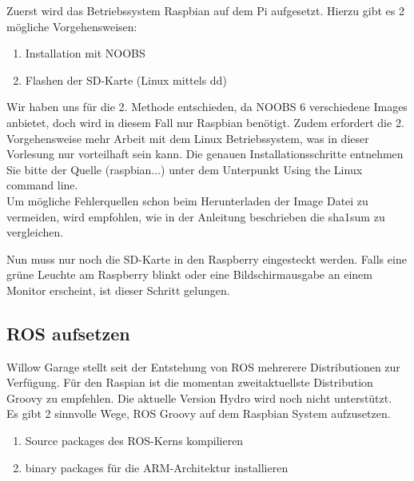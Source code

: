 \documentclass[12pt]{article}
\begin{document}
Zuerst wird das Betriebssystem Raspbian auf dem Pi aufgesetzt.
Hierzu gibt es 2 mögliche Vorgehensweisen:
\begin{enumerate}
\item Installation mit NOOBS
\item Flashen der SD-Karte (Linux mittels dd)
\end{enumerate}

Wir haben uns für die 2. Methode entschieden, da NOOBS 6 verschiedene Images anbietet, doch wird in diesem Fall nur Raspbian benötigt.
Zudem erfordert die 2. Vorgehensweise mehr Arbeit mit dem Linux Betriebssystem, was in dieser Vorlesung nur vorteilhaft sein kann.
Die genauen Installationsschritte entnehmen Sie bitte der Quelle (raspbian...) unter dem Unterpunkt Using the Linux command line. \\
Um mögliche Fehlerquellen schon beim Herunterladen der Image Datei zu vermeiden, wird empfohlen, wie in der Anleitung beschrieben die sha1sum zu vergleichen.

Nun muss nur noch die SD-Karte in den Raspberry eingesteckt werden. Falls eine grüne Leuchte am Raspberry blinkt oder eine Bildschirmausgabe an einem Monitor erscheint, ist dieser Schritt gelungen.

\subsection{ROS aufsetzen}
Willow Garage stellt seit der Entstehung von ROS mehrerere Distributionen zur Verfügung.
Für den Raspian ist die momentan zweitaktuellste Distribution Groovy zu empfehlen. 
Die aktuelle Version Hydro wird noch nicht unterstützt. \\
Es gibt 2 sinnvolle Wege, ROS Groovy auf dem Raspbian System aufzusetzen.
\begin{enumerate}
\item Source packages des ROS-Kerns kompilieren
\item binary packages für die ARM-Architektur installieren
\end{enumerate}
\end{document}

